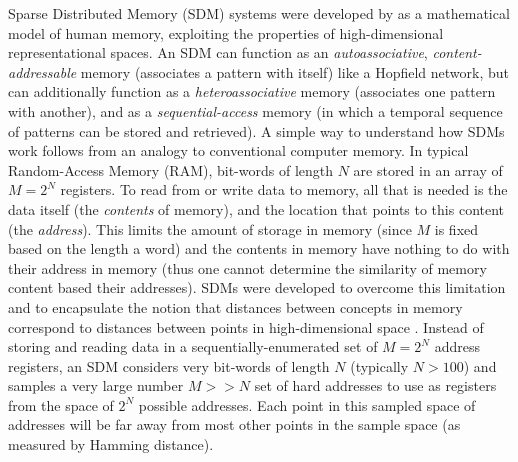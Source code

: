\documentclass[10pt,letterpaper]{article}
\begin{document}
Sparse Distributed Memory (SDM) systems were developed by  as a mathematical model of human memory, exploiting the properties of high-dimensional representational spaces.
An SDM can function as an \textit{autoassociative}, \textit{content-addressable} memory (associates a pattern with itself) like a Hopfield network, but can additionally function as a \textit{heteroassociative} memory (associates one pattern with another), and as a \textit{sequential-access} memory (in which a temporal sequence of patterns can be stored and retrieved). A simple way to understand how SDMs work follows from an analogy to conventional computer memory. In typical Random-Access Memory (RAM), bit-words of length $N$ are stored in an array of $M = 2^{N}$ registers. To read from or write data to memory, all that is needed is the data itself (the \textit{contents} of memory), and the location that points to this content (the \textit{address}). This limits the amount of storage in memory (since $M$ is fixed based on the length a word) and the contents in memory have nothing to do with their address in memory (thus one cannot determine the similarity of memory content based their addresses). SDMs were developed to overcome this limitation and to encapsulate the notion that distances between concepts in memory correspond to distances between points in high-dimensional space \cite{Kanerva1988}. Instead of storing and reading data in a sequentially-enumerated set of $M = 2^{N}$ address registers, an SDM considers very bit-words of length $N$ (typically $N > 100$) and samples a very large number $M >> N$ set of hard addresses to use as registers from the space of $2^{N}$ possible addresses. Each point in this sampled space of addresses will be far away from most other points in the sample space (as measured by Hamming distance).
\end{document}
